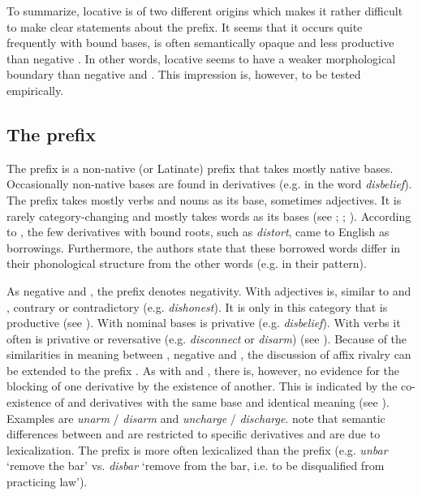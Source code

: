 To summarize, locative  is of two different origins which makes it rather difficult to make clear statements about the prefix. It seems that it occurs quite frequently with bound bases, is often semantically opaque and less productive than negative . In other words, locative  seems to have a weaker morphological boundary than negative  and . This impression is, however, to be tested empirically.

 
\subsection{The prefix }

The prefix  is a non-native (or Latinate) prefix that takes mostly native bases. Occasionally non-native bases are found in derivatives (e.g. in the word \textit{disbelief}). The prefix takes mostly verbs and nouns as its base, sometimes adjectives. It is rarely category-changing and mostly takes words as its bases (see \citealt[481]{Jespersen.1965}; \citealt[158ff.]{Marchand.1969}\mbox{;} \citealt[355, 357]{Bauer.2013}).
According to \citet[358]{Bauer.2013}, the few derivatives with bound roots, such as \textit{distort}, came to English as borrowings. Furthermore, the authors state that these borrowed words differ in their phonological structure from the other words (e.g. in their  pattern).


As negative  and , the prefix  denotes negativity.  With adjectives  is, similar to  and , contrary or contradictory (e.g. \textit{dishonest}). It is only in this category that  is productive (see \citealt[358]{Bauer.2013}). With nominal bases  is privative (e.g. \textit{disbelief}). With verbs it often is privative or reversative (e.g. \textit{disconnect} or \textit{disarm})  (see \citealt[372, 375]{Bauer.2013}).
Because of the similarities in meaning between , negative  and , the discussion of affix rivalry can be extended to the prefix . 
As with  and , there is, however, no evidence for the blocking of one derivative by the existence of another. This is indicated by the co-existence of  and derivatives with the same base and identical meaning (see \citealt[380]{Bauer.2013}). Examples are \textit{unarm} / \textit{disarm} and \textit{uncharge} / \textit{discharge}. 
\citet[380]{Bauer.2013} note that semantic differences between  and  are restricted to specific derivatives and are due to lexicalization. The prefix  is more often lexicalized than the prefix  (e.g. \textit{unbar} `remove the bar' vs. \textit{disbar} `remove from the bar, i.e. to be disqualified from practicing law').

